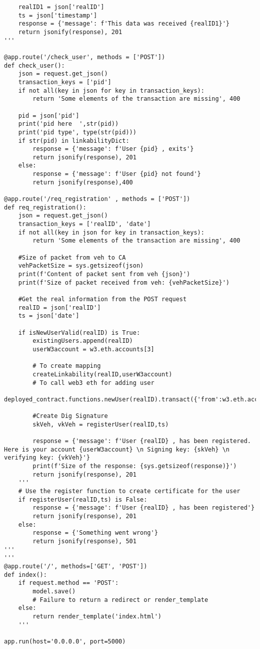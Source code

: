 \begin{linenumbers}
\begin{lstlisting}
    realID1 = json['realID']
    ts = json['timestamp']
    response = {'message': f'This data was received {realID1}'}
    return jsonify(response), 201
'''

@app.route('/check_user', methods = ['POST'])
def check_user():
    json = request.get_json()
    transaction_keys = ['pid']
    if not all(key in json for key in transaction_keys):
        return 'Some elements of the transaction are missing', 400
    
    pid = json['pid']
    print('pid here  ',str(pid))
    print('pid type', type(str(pid)))
    if str(pid) in linkabilityDict:
        response = {'message': f'User {pid} , exits'}
        return jsonify(response), 201
    else:
        response = {'message': f'User {pid} not found'}
        return jsonify(response),400

@app.route('/req_registration' , methods = ['POST'])
def req_registration():
    json = request.get_json()
    transaction_keys = ['realID', 'date']
    if not all(key in json for key in transaction_keys):
        return 'Some elements of the transaction are missing', 400

    #Size of packet from veh to CA
    vehPacketSize = sys.getsizeof(json)
    print(f'Content of packet sent from veh {json}')
    print(f'Size of packet received from veh: {vehPacketSize}')

    #Get the real information from the POST request
    realID = json['realID']
    ts = json['date']
    
    if isNewUserValid(realID) is True:
        existingUsers.append(realID)
        userW3account = w3.eth.accounts[3]

        # To create mapping
        createLinkability(realID,userW3account) 
        # To call web3 eth for adding user
        deployed_contract.functions.newUser(realID).transact({'from':w3.eth.accounts[0]}) 
        
        #Create Dig Signature
        skVeh, vkVeh = registerUser(realID,ts)

        response = {'message': f'User {realID} , has been registered. Here is your account {userW3account} \n Signing key: {skVeh} \n verifying key: {vkVeh}'}
        print(f'Size of the response: {sys.getsizeof(response)}')
        return jsonify(response), 201
    '''
    # Use the register function to create certificate for the user
    if registerUser(realID,ts) is False: 
        response = {'message': f'User {realID} , has been registered'}
        return jsonify(response), 201
    else:
        response = {'Something went wrong'}
        return jsonify(response), 501
'''
'''
@app.route('/', methods=['GET', 'POST'])
def index():
    if request.method == 'POST':
        model.save()
        # Failure to return a redirect or render_template
    else:
        return render_template('index.html')
    '''

app.run(host='0.0.0.0', port=5000)
\end{lstlisting}
\end{linenumbers} 


